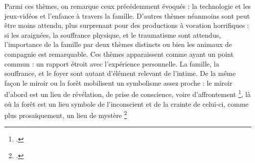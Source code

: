 \documentclass[12pt,a4paper,oneside,titlepage]{book} %
\begin{document}
	Parmi ces thèmes, on remarque ceux précédemment évoqués : la technologie et les jeux-vidéos et l'enfance à travers la famille. D'autres thèmes néanmoins sont peut être moins attendu, plus surprenant pour des productions à vocation horrifiques : si les araignées, la souffrance physique, et le traumatisme sont attendus, l'importance de la famille par deux thèmes distincts ou bien les animaux de compagnie est remarquable. 
	Ces thèmes apparaissent comme ayant un point commun : un rapport étroit avec l'expérience personnelle. La famille, la souffrance, et le foyer sont autant d'élément relevant de l'intime. 
	De la même façon le miroir ou la forêt mobilisent un symbolisme assez proche : le miroir d'abord est un lieu de révélation, de prise de conscience, voire d'affrontement \footcite[voir p.639, article "Miroir"]{chevalier_dictionnaire_1990}, là où la forêt est un lieu symbole de l'inconscient et de la crainte de celui-ci, comme plus prosaïquement, un lieu de mystère \footcite[voir p.455, article "Forêt"]{chevalier_dictionnaire_1990}
\end{document}
